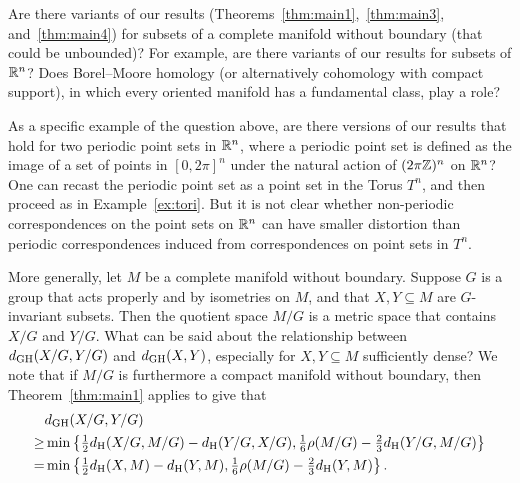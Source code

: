 \documentclass[11pt, reqno, english]{amsart}
\begin{document}
\vspace{3mm}
\begin{question}
Are there variants of our results (Theorems~\ref{thm:main1},~\ref{thm:main3}, and~\ref{thm:main4}) for subsets of a complete manifold without boundary (that could be unbounded)?
For example, are there variants of our results for subsets of $\mathbb{R}^n$?
Does Borel--Moore homology (or alternatively cohomology with compact support), in which every oriented manifold has a fundamental class, play a role?
\end{question}

\vspace{3mm}
\begin{question}
As a specific example of the question above, are there versions of our results that hold for two periodic point sets in $\mathbb{R}^n$, where a periodic point set is defined as the image of a set of points in $[0,2\pi]^n$ under the natural action of $(2\pi\mathbb{Z})^n$ on $\mathbb{R}^n$?
One can recast the periodic point set as a point set in the Torus $T^n$, and then proceed as in Example~\ref{ex:tori}.
But it is not clear whether non-periodic correspondences on the point sets on $\mathbb{R}^n$ can have smaller distortion than periodic correspondences induced from correspondences on point sets in $T^n$.

More generally, let $M$ be a complete manifold without boundary.
Suppose $G$ is a group that acts properly and by isometries on $M$, and that $X,Y\subseteq M$ are $G$-invariant subsets.
Then the quotient space $M/G$ is a metric space that contains $X/G$ and $Y/G$.
What can be said about the relationship between $d_{\mathrm{GH}}(X/G,Y/G)$ and $d_{\mathrm{GH}}(X,Y)$, especially for $X,Y\subseteq M$ sufficiently dense?
We note that if $M/G$ is furthermore a compact manifold without boundary, then Theorem~\ref{thm:main1} applies to give that
\begin{align*}
&d_{\mathrm{GH}}(X/G,Y/G)\\
\ge& \min\left\{\tfrac{1}{2}d_{\mathrm{H}}(X/G,M/G)-d_{\mathrm{H}}(Y/G,X/G), \tfrac{1}{6}\rho(M/G)-\tfrac{2}{3}d_{\mathrm{H}}(Y/G,M/G)\right\}\\
=& \min\left\{\tfrac{1}{2}d_{\mathrm{H}}(X,M)-d_{\mathrm{H}}(Y,M), \tfrac{1}{6}\rho(M/G)-\tfrac{2}{3}d_{\mathrm{H}}(Y,M)\right\}.
\end{align*}
\end{question}
\end{document}
